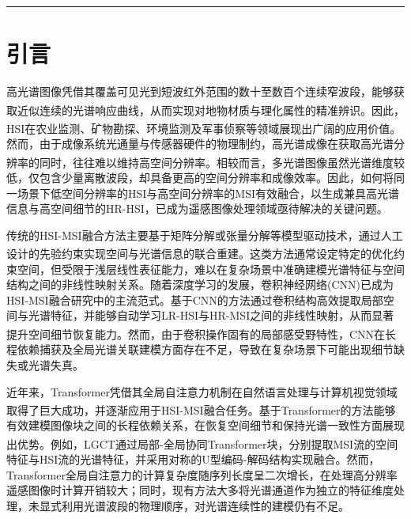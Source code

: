\documentclass[UTF8,a4paper,11pt]{ctexart}
\newcommand{\upcite}[1]{\textsuperscript{\cite{#1}}}
\begin{document}
\vspace{4pt}

\vspace{10pt}
\hrule
\vspace{10pt}

\section{引言}
高光谱图像凭借其覆盖可见光到短波红外范围的数十至数百个连续窄波段，能够获取近似连续的光谱响应曲线，从而实现对地物材质与理化属性的精准辨识\upcite{ref1}。因此，HSI在农业监测、矿物勘探、环境监测及军事侦察等领域展现出广阔的应用价值\upcite{ref2,ref3,ref4}。然而，由于成像系统光通量与传感器硬件的物理制约，高光谱成像在获取高光谱分辨率的同时，往往难以维持高空间分辨率\upcite{ref5}。相较而言，多光谱图像虽然光谱维度较低，仅包含少量离散波段，却具备更高的空间分辨率和成像效率。因此，如何将同一场景下低空间分辨率的HSI与高空间分辨率的MSI有效融合，以生成兼具高光谱信息与高空间细节的HR-HSI，已成为遥感图像处理领域亟待解决的关键问题。

传统的HSI-MSI融合方法主要基于矩阵分解或张量分解等模型驱动技术，通过人工设计的先验约束实现空间与光谱信息的联合重建\upcite{ref6,ref7}。这类方法通常设定特定的优化约束空间，但受限于浅层线性表征能力，难以在复杂场景中准确建模光谱特征与空间结构之间的非线性映射关系。随着深度学习的发展，卷积神经网络(CNN)已成为HSI-MSI融合研究中的主流范式。基于CNN的方法通过卷积结构高效提取局部空间与光谱特征，并能够自动学习LR-HSI与HR-MSI之间的非线性映射，从而显著提升空间细节恢复能力\upcite{ref8,ref9,ref10}。然而，由于卷积操作固有的局部感受野特性，CNN在长程依赖捕获及全局光谱关联建模方面存在不足，导致在复杂场景下可能出现细节缺失或光谱失真。

近年来，Transformer凭借其全局自注意力机制在自然语言处理与计算机视觉领域取得了巨大成功，并逐渐应用于HSI-MSI融合任务\upcite{ref11,ref12}。基于Transformer的方法能够有效建模图像块之间的长程依赖关系，在恢复空间细节和保持光谱一致性方面展现出优势。例如，LGCT\upcite{ref13}通过局部-全局协同Transformer块，分别提取MSI流的空间特征与HSI流的光谱特征，并采用对称的U型编码-解码结构实现融合。然而，Transformer全局自注意力的计算复杂度随序列长度呈二次增长，在处理高分辨率遥感图像时计算开销较大；同时，现有方法大多将光谱通道作为独立的特征维度处理，未显式利用光谱波段的物理顺序，对光谱连续性的建模仍有不足。
\end{document}
